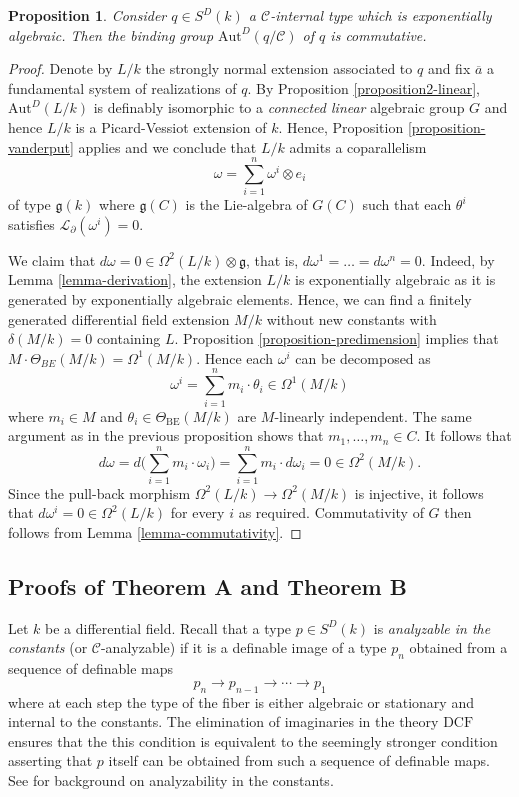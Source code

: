 \documentclass[12pt]{amsart}
\newcommand{\DCF}{\mathrm{DCF}}
\newcommand{\BE}{\mathrm{BE}}
\theoremstyle{definition}
\theoremstyle{plain}
\newtheorem{Prop}[defn]{Proposition}
\theoremstyle{exampstyle}\newtheorem{thmx}{Theorem}
\theoremstyle{exampstyle}\newtheorem{thmxbis}{Theorem}
\begin{document}
\begin{Prop}\label{proposition-commutative}
Consider $q \in S^D(k)$ a $\mathcal C$-internal type which is exponentially algebraic. Then the binding group $\mathrm{Aut}^D(q/\mathcal C)$ of $q$ is commutative. 
\end{Prop} 

\begin{proof} 
Denote by $L/k$ the strongly normal extension associated to $q$ and fix $\overline{a}$ a fundamental system of realizations of $q$. 
By Proposition \ref{proposition2-linear}, $\mathrm{Aut}^D(L/k)$ is definably isomorphic  to a {\em connected linear} algebraic group $G$ and hence $L/k$ is a Picard-Vessiot extension of $k$. Hence, Proposition \ref{proposition-vanderput} applies and we conclude that $L/k$ admits a coparallelism 
$$ \omega = \sum_{i = 1}^n \omega^i \otimes e_i  $$
of type $\mathfrak{g}(k)$ where $\mathfrak{g}(C)$ is the Lie-algebra of $G(C)$ such that each $\theta^i$ satisfies $\mathcal L_\partial(\omega^i) = 0$.

We claim that $d\omega = 0 \in \Omega^2(L/k) \otimes \mathfrak{g}$, that is, $d\omega^1 = \ldots = d\omega^n = 0$. Indeed, by Lemma \ref{lemma-derivation}, the extension $L/k$ is exponentially algebraic as it is generated by exponentially algebraic elements. Hence, we can find a finitely generated differential field extension $M/k$  without new constants with $\delta(M/k) = 0$ containing $L$. Proposition \ref{proposition-predimension} implies that $M \cdot \Theta_{BE}(M/k) = \Omega^1(M/k)$. Hence each $\omega^i$ can be decomposed as 
$$ \omega^i = \sum_{i = 1}^n m_i \cdot  \theta_i \in \Omega^1(M/k)$$
where $m_i \in M$ and $\theta_i \in \Theta_{\BE}(M/k)$ are $M$-linearly independent. The same argument as in the previous proposition shows that $m_1,\ldots, m_n \in C$. It follows that 
$$d \omega = d\Big(\sum_{i = 1}^n m_i \cdot \omega_i\Big) = \sum_{i = 1}^n m_i \cdot d\omega_i =  0 \in \Omega^2(M/k).$$
Since the pull-back morphism $\Omega^2(L/k) \rightarrow \Omega^2(M/k)$ is injective, it follows that $d\omega^i = 0 \in \Omega^2(L/k)$ for every $i$ as required. Commutativity of $G$ then follows from Lemma \ref{lemma-commutativity}. 
\end{proof}



\subsection{Proofs of Theorem A and Theorem B} Let $k$ be a differential field. Recall that a type $p \in S^D(k)$ is {\em analyzable in the constants} (or $\mathcal C$-analyzable) if it is a definable image of a type $p_n$ obtained from a sequence of definable maps
$$ p_n \rightarrow p_{n-1} \rightarrow \cdots \rightarrow p_1 $$
where at each step the type of the fiber is either algebraic or stationary and internal to the constants. The elimination of imaginaries in the theory $\DCF$ ensures that the this condition is equivalent to the seemingly stronger condition asserting that $p$ itself can be obtained from such a sequence of definable maps. See \cite{Jin} for background on analyzability in the constants.
\end{document}
